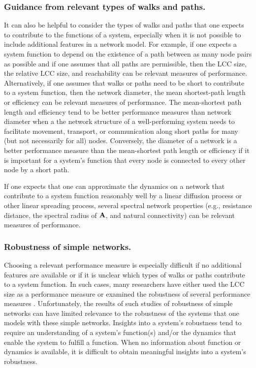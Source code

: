 \documentclass{comnet-mod}
\begin{document}
\subsubsection{Guidance from relevant types of walks and paths.}


It can also be helpful to consider the types of walks and paths that one expects to contribute to the functions of a system, especially when it is not possible to include additional features in a network model. For example, if one expects a system function to depend on the existence of a path between as many node pairs as possible and if one assumes that all paths are permissible, then the LCC size, the relative LCC size, and reachability can be relevant measures of performance. Alternatively, if one assumes that walks or paths need to be short to contribute to a system function, then the network diameter, the mean shortest-path length or efficiency can be relevant measures of performance. The mean-shortest path length and efficiency tend to be better performance measures than network diameter when a the network structure of a well-performing system needs to facilitate movement, transport, or communication along short paths for many (but not necessarily for all) nodes. Conversely, the diameter of a network is a better performance measure than the mean-shortest path length or efficiency if it is important for a system's function that every node is connected to every other node by a short path. 

If one expects that one can approximate the dynamics on a network that contribute to a system function reasonably well by a linear diffusion process or other linear spreading process, several spectral network properties (e.g., resistance distance, the spectral radius of $\bf A$, and natural connectivity) can be relevant measures of performance.


\subsubsection{Robustness of simple networks.}

Choosing a relevant performance measure is especially difficult if no additional features are available or if it is unclear which types of walks or paths contribute to a system function. In such cases, many researchers have either used the LCC size as a performance measure \cite{Cohen2000, Bollobas2004, Paul2004, Tanizawa2005, Wang2006, Sole2008, Herrmann2011, Zeng2012, Louzada2013, Rosas-Casals2007} or examined the robustness of several performance measures \cite{Albert2000, Hossain2013, Lordan2014, Ventresca2014}. Unfortunately, the results of such studies of robustness of simple networks can have limited relevance to the robustness of the systems that one models with these simple networks. Insights into a system's robustness tend to require an understanding of a system's function(s) and/or the dynamics that enable the system to fulfill a function. When no information about function or dynamics is available, it is difficult to obtain meaningful insights into a system's robustness. 
\end{document}
